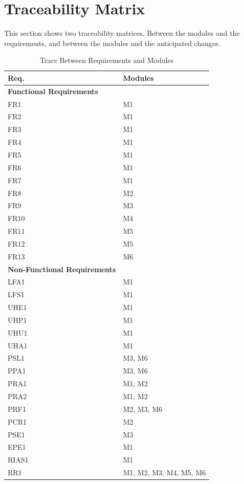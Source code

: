 \documentclass[12pt, titlepage]{article}
\begin{document}
\section{Traceability Matrix}
This section shows two traceability matrices. Between the modules and the requirements, and between the modules and the anticipated changes.


\begin{table}[H]
    \centering
    \begin{tabular}{p{} p{}}
        \toprule
        \textbf{Req.} & \textbf{Modules}\\
        \midrule
        \textbf{Functional Requirements}\\
        \midrule
        FR1 & M1\\
        FR2 & M1\\
        FR3 & M1\\
        FR4 & M1\\
        FR5 & M1\\
        FR6 & M1\\
        FR7 & M1\\
        FR8 & M2\\
        FR9 & M3\\
        FR10 & M4\\
        FR11 & M5\\
        FR12 & M5\\
        FR13 & M6\\
        \midrule
        \textbf{Non-Functional Requirements}\\
        \midrule
        LFA1 & M1\\
        LFS1 & M1\\
        UHE1 & M1 \\
        UHP1 & M1 \\
        UHU1 & M1 \\
        UHA1 & M1 \\
        PSL1 & M3, M6 \\
        PPA1 &  M3, M6\\ 
        PRA1 & M1, M2 \\
        PRA2 & M1, M2 \\
        PRF1 & M2, M3, M6 \\
        PCR1 & M2 \\
        PSE1 & M3 \\
        EPE1 & M1 \\
        RIAS1 & M1 \\
        RR1 & M1, M2, M3, M4, M5, M6 \\
        \bottomrule
    \end{tabular}
    \caption{Trace Between Requirements and Modules}
\end{table}
\end{document}
